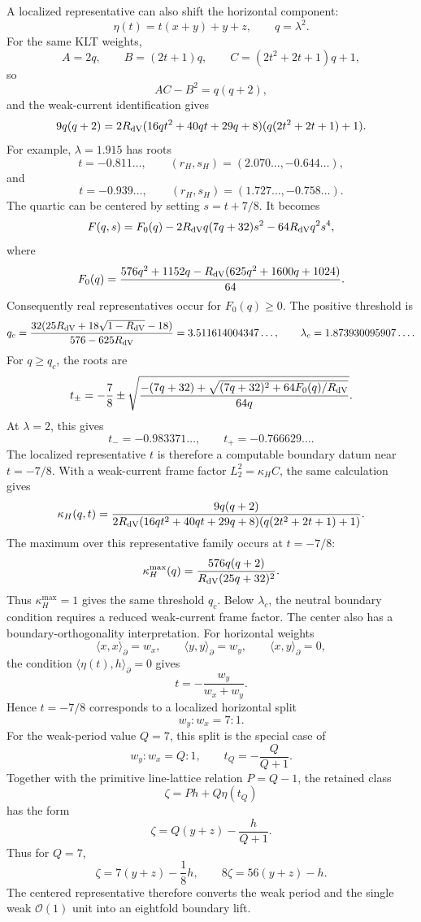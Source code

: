 \documentclass[11pt]{article}
\theoremstyle{definition}
\theoremstyle{remark}
\newcommand{\cO}{\mathcal O}
\begin{document}
A localized representative can also shift the horizontal component:
\[
  \eta(t)=t(x+y)+y+z,\qquad q=\lambda^2.
\]
For the same KLT weights,
\[
  A=2q,\qquad
  B=(2t+1)q,\qquad
  C=(2t^2+2t+1)q+1,
\]
so
\[
  AC-B^2=q(q+2),
\]
and the weak-current identification gives
\[
  9q(q+2)
  =
  2R_{\rm dV}
  (16qt^2+40qt+29q+8)(q(2t^2+2t+1)+1).
\]
For example, \(\lambda=1.915\) has roots
\[
  t=-0.811\ldots,\qquad (r_H,s_H)=(2.070\ldots,-0.644\ldots),
\]
and
\[
  t=-0.939\ldots,\qquad (r_H,s_H)=(1.727\ldots,-0.758\ldots).
\]
The quartic can be centered by setting \(s=t+7/8\).  It becomes
\[
  F(q,s)=F_0(q)-2R_{\rm dV}q(7q+32)s^2-64R_{\rm dV}q^2s^4,
\]
where
\[
  F_0(q)
  =
  \frac{576q^2+1152q-R_{\rm dV}(625q^2+1600q+1024)}{64}.
\]
Consequently real representatives occur for \(F_0(q)\ge0\).  The positive
threshold is
\[
  q_c=
  \frac{32(25R_{\rm dV}+18\sqrt{1-R_{\rm dV}}-18)}
       {576-625R_{\rm dV}}
  =
  3.511614004347\ldots ,
  \qquad
  \lambda_c=1.873930095907\ldots .
\]
For \(q\ge q_c\), the roots are
\[
  t_\pm=-\frac78\pm
  \sqrt{
  \frac{-(7q+32)+\sqrt{(7q+32)^2+64F_0(q)/R_{\rm dV}}}
       {64q}} .
\]
At \(\lambda=2\), this gives
\[
  t_-=-0.983371\ldots,\qquad t_+=-0.766629\ldots .
\]
The localized representative \(t\) is therefore a computable boundary datum
near \(t=-7/8\).
With a weak-current frame factor \(L_2^2=\kappa_H C\), the same calculation
gives
\[
  \kappa_H(q,t)
  =
  \frac{9q(q+2)}
       {2R_{\rm dV}(16qt^2+40qt+29q+8)(q(2t^2+2t+1)+1)}.
\]
The maximum over this representative family occurs at \(t=-7/8\):
\[
  \kappa_H^{\max}(q)
  =
  \frac{576q(q+2)}{R_{\rm dV}(25q+32)^2}.
\]
Thus \(\kappa_H^{\max}=1\) gives the same threshold \(q_c\).  Below
\(\lambda_c\), the neutral boundary condition requires a reduced
weak-current frame factor.
The center also has a boundary-orthogonality interpretation.  For horizontal
weights
\[
  \langle x,x\rangle_\partial=w_x,\qquad
  \langle y,y\rangle_\partial=w_y,\qquad
  \langle x,y\rangle_\partial=0,
\]
the condition \(\langle\eta(t),h\rangle_\partial=0\) gives
\[
  t=-\frac{w_y}{w_x+w_y}.
\]
Hence \(t=-7/8\) corresponds to a localized horizontal split
\[
  w_y:w_x=7:1.
\]
For the weak-period value \(Q=7\), this split is the special case of
\[
  w_y:w_x=Q:1,\qquad t_Q=-\frac{Q}{Q+1}.
\]
Together with the primitive line-lattice relation \(P=Q-1\), the retained
class
\[
  \zeta=P h+Q\eta(t_Q)
\]
has the form
\[
  \zeta
  =
  Q(y+z)-\frac{h}{Q+1}.
\]
Thus for \(Q=7\),
\[
  \zeta=7(y+z)-\frac18h,\qquad 8\zeta=56(y+z)-h.
\]
The centered representative therefore converts the weak period and the single
weak \(\cO(1)\) unit into an eightfold boundary lift.
\end{document}
